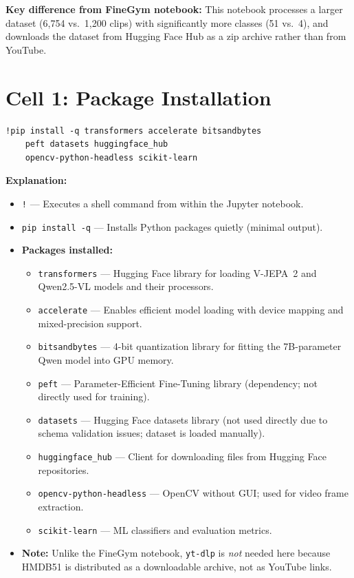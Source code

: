 \documentclass[a4paper, 12pt]{article}
\newenvironment{explanation}{%
  \par\smallskip
  \noindent\textcolor{blue!70!black}{\textbf{Explanation:}}\\
  \noindent
}{\par\medskip}
\begin{document}
\textbf{Key difference from FineGym notebook:} This notebook processes a larger dataset (6,754 vs.\ 1,200 clips) with significantly more classes (51 vs.\ 4), and downloads the dataset from Hugging Face Hub as a zip archive rather than from YouTube.

\newpage
\section{Cell 1: Package Installation}

\begin{lstlisting}
!pip install -q transformers accelerate bitsandbytes
    peft datasets huggingface_hub
    opencv-python-headless scikit-learn
\end{lstlisting}

\begin{explanation}
\begin{itemize}[nosep]
  \item \texttt{!} --- Executes a shell command from within the Jupyter notebook.
  \item \texttt{pip install -q} --- Installs Python packages quietly (minimal output).
  \item \textbf{Packages installed:}
  \begin{itemize}[nosep]
    \item \texttt{transformers} --- Hugging Face library for loading V-JEPA~2 and Qwen2.5-VL models and their processors.
    \item \texttt{accelerate} --- Enables efficient model loading with device mapping and mixed-precision support.
    \item \texttt{bitsandbytes} --- 4-bit quantization library for fitting the 7B-parameter Qwen model into GPU memory.
    \item \texttt{peft} --- Parameter-Efficient Fine-Tuning library (dependency; not directly used for training).
    \item \texttt{datasets} --- Hugging Face datasets library (not used directly due to schema validation issues; dataset is loaded manually).
    \item \texttt{huggingface\_hub} --- Client for downloading files from Hugging Face repositories.
    \item \texttt{opencv-python-headless} --- OpenCV without GUI; used for video frame extraction.
    \item \texttt{scikit-learn} --- ML classifiers and evaluation metrics.
  \end{itemize}
  \item \textbf{Note:} Unlike the FineGym notebook, \texttt{yt-dlp} is \textit{not} needed here because HMDB51 is distributed as a downloadable archive, not as YouTube links.
\end{itemize}
\end{explanation}
\end{document}
